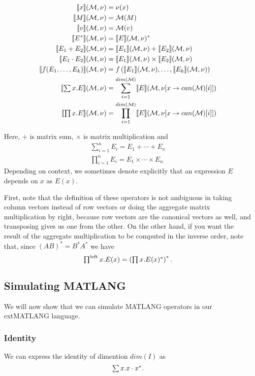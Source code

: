 \begin{align*}
\llbracket x \rrbracket(\mathcal{M},\nu)&=\nu (x)\\
\llbracket M \rrbracket(\mathcal{M},\nu)&=\mathcal{M} (M) \\
\llbracket v \rrbracket(\mathcal{M},\nu)&=\mathcal{M} (v) \\
\llbracket E^* \rrbracket(\mathcal{M},\nu)&=\llbracket E \rrbracket(\mathcal{M},\nu)^* \\
\llbracket E_1+E_2 \rrbracket(\mathcal{M},\nu)&= \llbracket E_1 \rrbracket(\mathcal{M},\nu)+\llbracket E_2 \rrbracket(\mathcal{M},\nu)\\
\llbracket E_1\cdot E_2 \rrbracket(\mathcal{M},\nu)&= \llbracket E_1 \rrbracket(\mathcal{M},\nu)\times \llbracket E_2 \rrbracket(\mathcal{M},\nu)\\
\llbracket f(E_1,\ldots ,E_k) \rrbracket(\mathcal{M},\nu) &= f\left(\llbracket E_1 \rrbracket(\mathcal{M},\nu),\ldots , \llbracket E_k \rrbracket(\mathcal{M},\nu)\right)\\
\llbracket \textstyle\sum x.E \rrbracket(\mathcal{M},\nu)&= \sum_{i=1}^{dim(\mathcal{M})}\llbracket E \rrbracket(\mathcal{M},\nu[x\rightarrow can(\mathcal{M})[i]])\\
\llbracket \textstyle\prod x. E \rrbracket(\mathcal{M},\nu)&= \prod_{i=1}^{dim(\mathcal{M})}\llbracket E \rrbracket(\mathcal{M},\nu[x\rightarrow can(\mathcal{M})[i]])
\end{align*}

Here, $+$ is matrix sum, $\times$ is matrix multiplication and 
\begin{align*}
\sum_{i=1}^n E_i = E_1+\cdots + E_n \\
\prod_{i=1}^n E_i = E_1\times \cdots\times E_n
\end{align*}
Depending on context, we sometimes denote explicitly that an expression $E$ depends on $x$ as $E(x)$.

First, note that the definition of these operators is not ambiguous in taking column vectors instead of row vectors or doing the aggregate matrix multiplication by right, because row vectors are the canonical vectors as well, and transposing gives us one from the other. On the other hand, if you want the result of the aggregate multiplication to be computed in the inverse order, note that, since $(AB)^*=B^*A^*$ we have $$\textstyle\prod^{\text{left}} x.E(x)=\left(\textstyle\prod x.E(x)^*\right)^*.$$

\subsection{Simulating MATLANG}

We will now show that we can simulate MATLANG operators in our extMATLANG language.

\subsubsection{Identity}

We can express the identity of dimention $dim(I)$ as $$\textstyle\sum x. x\cdot x^*.$$

